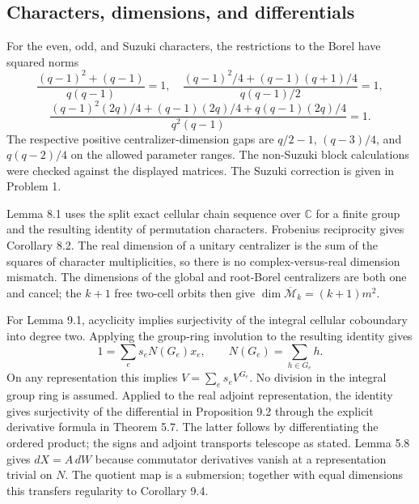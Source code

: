\documentclass[10pt]{article}
\begin{document}
\subsection*{Characters, dimensions, and differentials}
For the even, odd, and Suzuki characters, the restrictions to the Borel have squared norms \[\frac{(q-1)^2+(q-1)}{q(q-1)}=1,\quad
 \frac{(q-1)^2/4+(q-1)(q+1)/4}{q(q-1)/2}=1,\] \[\frac{(q-1)^2(2q)/4+(q-1)(2q)/4+q(q-1)(2q)/4}
 {q^2(q-1)}=1.\] The respective positive centralizer-dimension gaps are \(q/2-1\), \((q-3)/4\), and \(q(q-2)/4\) on the allowed parameter ranges. The non-Suzuki block calculations were checked against the displayed matrices. The Suzuki correction is given in Problem 1.\par
Lemma 8.1 uses the split exact cellular chain sequence over \(\mathbb C\) for a finite group and the resulting identity of permutation characters. Frobenius reciprocity gives Corollary 8.2. The real dimension of a unitary centralizer is the sum of the squares of character multiplicities, so there is no complex-versus-real dimension mismatch. The dimensions of the global and root-Borel centralizers are both one and cancel; the \(k+1\) free two-cell orbits then give \(\dim\overline{\mathcal M}_k=(k+1)m^2\).\par
For Lemma 9.1, acyclicity implies surjectivity of the integral cellular coboundary into degree two. Applying the group-ring involution to the resulting identity gives \[1=\sum_e s_eN(G_e)x_e,\qquad
 N(G_e)=\sum_{h\in G_e}h .\] On any representation this implies \(V=\sum_es_eV^{G_e}\). No division in the integral group ring is assumed. Applied to the real adjoint representation, the identity gives surjectivity of the differential in Proposition 9.2 through the explicit derivative formula in Theorem 5.7. The latter follows by differentiating the ordered product; the signs and adjoint transports telescope as stated. Lemma 5.8 gives \(dX=A\,dW\) because commutator derivatives vanish at a representation trivial on \(N\). The quotient map is a submersion; together with equal dimensions this transfers regularity to Corollary 9.4.\par
\end{document}
